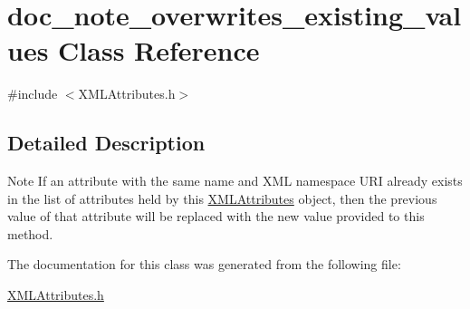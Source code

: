 \hypertarget{classdoc__note__overwrites__existing__values}{}\section{doc\+\_\+note\+\_\+overwrites\+\_\+existing\+\_\+values Class Reference}
\label{classdoc__note__overwrites__existing__values}


{\ttfamily \#include $<$X\+M\+L\+Attributes.\+h$>$}



\subsection{Detailed Description}
\begin{DoxyNote}{Note}
If an attribute with the same name and X\+ML namespace U\+RI already exists in the list of attributes held by this \hyperlink{class_x_m_l_attributes}{X\+M\+L\+Attributes} object, then the previous value of that attribute will be replaced with the new value provided to this method. 
\end{DoxyNote}


The documentation for this class was generated from the following file\+:\begin{DoxyCompactItemize}
\item 
\hyperlink{_x_m_l_attributes_8h}{X\+M\+L\+Attributes.\+h}\end{DoxyCompactItemize}
